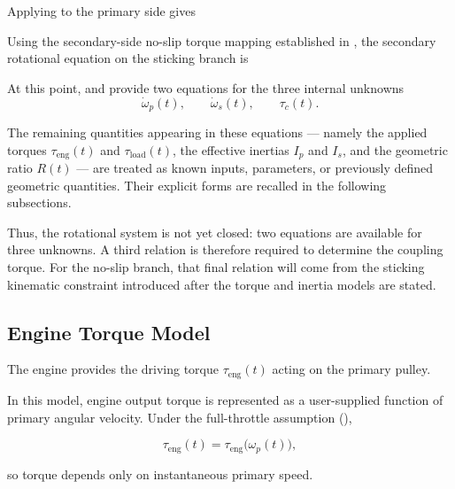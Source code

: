\documentclass[11pt]{article}
\numberwithin{equation}{section}
\newcounter{theory}
\newcounter{assump}
\begin{document}
Applying  to the primary side gives


Using the secondary-side no-slip torque mapping established in
, the secondary rotational equation on the sticking branch is


At this point,  and 
provide two equations for the three internal unknowns
\[
\dot{\omega}_p(t),\qquad
\dot{\omega}_s(t),\qquad
\tau_c(t).
\]

The remaining quantities appearing in these equations
--- namely the applied torques $\tau_{\text{eng}}(t)$ and $\tau_{\text{load}}(t)$,
the effective inertias $I_p$ and $I_s$, and the geometric ratio $R(t)$ ---
are treated as known inputs, parameters, or previously defined geometric
quantities.
Their explicit forms are recalled in the following subsections.

Thus, the rotational system is not yet closed:
two equations are available for three unknowns.
A third relation is therefore required to determine the coupling torque.
For the no-slip branch, that final relation will come from the sticking
kinematic constraint introduced after the torque and inertia models are stated.

\subsection{Engine Torque Model}
\label{sec:tau_eng_model}

The engine provides the driving torque
$\tau_{\text{eng}}(t)$ acting on the primary pulley.

In this model, engine output torque is represented as a
user-supplied function of primary angular velocity.
Under the full-throttle assumption
(),

\begin{equation}
\tau_{\text{eng}}(t)
=
\tau_{\text{eng}}\!\big(\omega_p(t)\big),
\label{eq:tau_eng_from_curve}
\end{equation}

so torque depends only on instantaneous primary speed.
\end{document}
